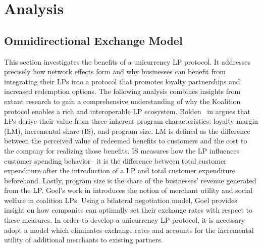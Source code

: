 \section{Analysis}
\subsection{Omnidirectional Exchange Model}
%
This section investigates the benefits of a unicurrency LP protocol. It addresses precisely how network effects form and why businesses can benefit from integrating their LPs into a protocol that promotes loyalty partnerships and increased redemption options. The following analysis combines insights from extant research to gain a comprehensive understanding of why the Koalition protocol enables a rich and interoperable LP ecosystem. Bolden \etal\ in \cite{Bolden14} argues that LPs derive their value from three inherent program characteristics: loyalty margin (LM), incremental share (IS), and program size. LM is defined as the difference between the perceived value of redeemed benefits to customers and the cost to the company for realizing those benefits. IS measures how the LP influences customer spending behavior-- it is the difference between total customer expenditure after the introduction of a LP and total customer expenditure beforehand. Lastly, program size is the share of the businesses' revenue generated from the LP. Goel's work in \cite{Goel17} introduces the notion of merchant utility and social welfare in coalition LPs. Using a bilateral negotiation model, Goel provides insight on how companies can optimally set their exchange rates with respect to these measures. In order to develop a unicurrency LP protocol, it is necessary adopt a model which eliminates exchange rates and accounts for the incremental utility of additional merchants to existing partners. %

